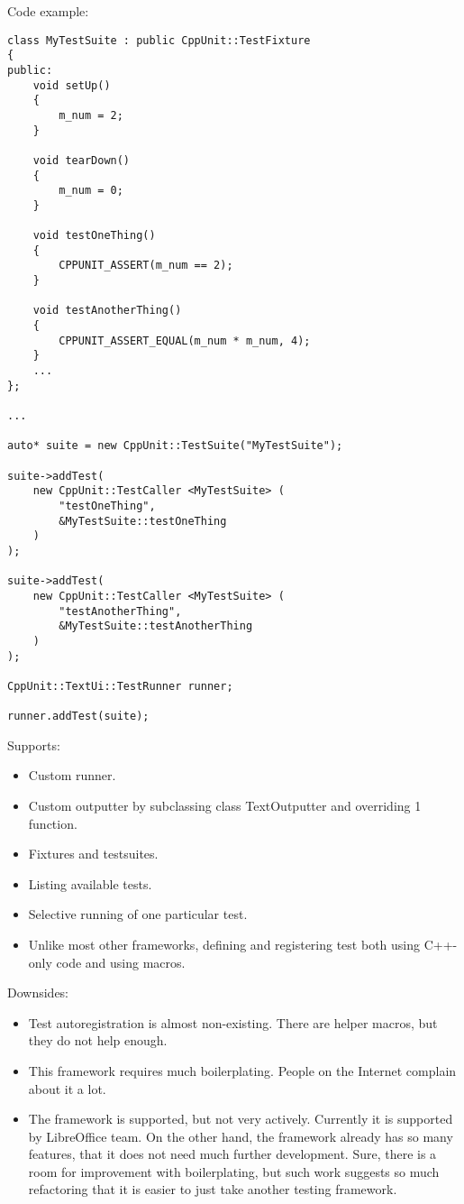 \documentclass[10pt, a5paper]{article}
\begin{document}
Code example:
\begin{verbatim}
class MyTestSuite : public CppUnit::TestFixture
{
public:
    void setUp()
    {
        m_num = 2;
    }

    void tearDown()
    {
        m_num = 0;
    }

    void testOneThing()
    {
        CPPUNIT_ASSERT(m_num == 2);
    }

    void testAnotherThing()
    {
        CPPUNIT_ASSERT_EQUAL(m_num * m_num, 4);
    }
    ...
};

...

auto* suite = new CppUnit::TestSuite("MyTestSuite");

suite->addTest(
    new CppUnit::TestCaller <MyTestSuite> (
        "testOneThing",
        &MyTestSuite::testOneThing
    )
);

suite->addTest(
    new CppUnit::TestCaller <MyTestSuite> (
        "testAnotherThing",
        &MyTestSuite::testAnotherThing
    )
);

CppUnit::TextUi::TestRunner runner;

runner.addTest(suite);

\end{verbatim}

Supports:

\begin{itemize}
  \item Custom runner.
  \item Custom outputter by subclassing class TextOutputter and \linebreak overriding 1 function.
  \item Fixtures and testsuites.
  \item Listing available tests.
  \item Selective running of one particular test.
  \item Unlike most other frameworks, defining and registering test both using C++-only code and using macros.
\end{itemize}

Downsides:

\begin{itemize}
  \item Test autoregistration is almost non-existing. There are helper macros, but they do not help enough.
  \item This framework requires much boilerplating. People on the Internet complain about it a lot.
  \item The framework is supported, but not very actively. Currently it is supported by LibreOffice team. On the other hand, the framework already has so many features, that it does not need much further development. Sure, there is a room for improvement with boilerplating, but such work suggests so much refactoring that it is easier to just take another testing framework.
\end{itemize}
\end{document}
